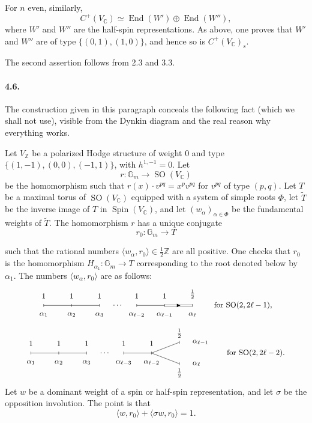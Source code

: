 \documentclass[10pt,leqno]{article}
\newcommand{\C}{\mathbb{C}}
\newcommand{\Z}{\mathbb{Z}}
\newcommand{\Gm}{\mathbb{G}_m}
\newcommand{\End}{\operatorname{End}}
\newcommand{\SO}{\operatorname{SO}}
\newcommand{\Spin}{\operatorname{Spin}}
\begin{document}
For $n$ even, similarly,
\[
C^+(V_\C)\simeq\End(W')\oplus\End(W''),
\]
where $W'$ and $W''$ are the half-spin representations. As above, one proves that $W'$ and $W''$ are of type $\{(0,1),(1,0)\}$, and hence so is $C^+(V_\C)_s$.

The second assertion follows from 2.3 and 3.3.

\paragraph{4.6.} The construction given in this paragraph conceals the following fact (which we shall not use), visible from the Dynkin diagram and the real reason why everything works.

Let $V_\Z$ be a polarized Hodge structure of weight $0$ and type $\{(1,-1),(0,0),(-1,1)\}$, with $h^{1,-1}=0$. Let
\[
r:\Gm\longrightarrow\SO(V_\C)
\]
be the homomorphism such that $r(x)\cdot v^{pq}=x^p v^{pq}$ for $v^{pq}$ of type $(p,q)$. Let $T$ be a maximal torus of $\SO(V_\C)$ equipped with a system of simple roots $\Phi$, let $\widetilde T$ be the inverse image of $T$ in $\Spin(V_\C)$, and let $(w_\alpha)_{\alpha\in\Phi}$ be the fundamental weights of $\widetilde T$. The homomorphism $r$ has a unique conjugate
\[
r_0:\Gm\longrightarrow T
\]

\clearpage

such that the rational numbers $\langle w_\alpha,r_0\rangle\in\frac12\Z$ are all positive. One checks that $r_0$ is the homomorphism $H_{\alpha_1}:\Gm\to T$ corresponding to the root denoted below by $\alpha_1$. The numbers $\langle w_\alpha,r_0\rangle$ are as follows:
\[
\begin{tikzpicture}[x=0.78cm,y=0.72cm,baseline=(current bounding box.center),font=\small]
\draw (0,0)--(3,0);
\node at (4,0) {$\cdots$};
\draw (5,0)--(6.5,0);
\draw[double distance=1.0pt] (6.5,0)--(8,0); \fill (7.35,0)--(7.16,0.10)--(7.16,-0.10)--cycle;
\foreach \x/\a/\v in {0/{\alpha_1}/1,1.5/{\alpha_2}/1,3/{\alpha_3}/1,5/{\alpha_{\ell-2}}/1,6.5/{\alpha_{\ell-1}}/1,8/{\alpha_\ell}/{\frac12}}{
  \draw (\x,-0.08)--(\x,0.08);
  \node[above=5pt] at (\x,0) {$\v$};
  \node[below=5pt] at (\x,0) {$\a$};
}
\node[anchor=west] at (9,0) {for $\SO(2,2\ell-1)$,};
\end{tikzpicture}
\]
\[
\begin{tikzpicture}[x=0.78cm,y=0.72cm,baseline=(current bounding box.center),font=\small]
\draw (0,0)--(3,0);
\node at (4,0) {$\cdots$};
\draw (5,0)--(6.5,0);
\draw (6.5,0)--(8,0.62);
\draw (6.5,0)--(8,-0.62);
\foreach \x/\a in {0/{\alpha_1},1.5/{\alpha_2},3/{\alpha_3},5/{\alpha_{\ell-3}},6.5/{\alpha_{\ell-2}}}{
  \draw (\x,-0.08)--(\x,0.08);
  \node[above=5pt] at (\x,0) {$1$};
  \node[below=5pt] at (\x,0) {$\a$};
}
\draw (8,0.54)--(8,0.70);
\draw (8,-0.70)--(8,-0.54);
\node[above=2pt] at (8,0.62) {$\frac12$};
\node[below=2pt] at (8,-0.62) {$\frac12$};
\node[anchor=west] at (8.55,0.62) {$\alpha_{\ell-1}$};
\node[anchor=west] at (8.55,-0.62) {$\alpha_\ell$};
\node[anchor=west] at (10.4,0) {for $\SO(2,2\ell-2)$.};
\end{tikzpicture}
\]
Let $w$ be a dominant weight of a spin or half-spin representation, and let $\sigma$ be the opposition involution. The point is that
\[
\langle w,r_0\rangle+\langle\sigma w,r_0\rangle=1.
\]
\end{document}
